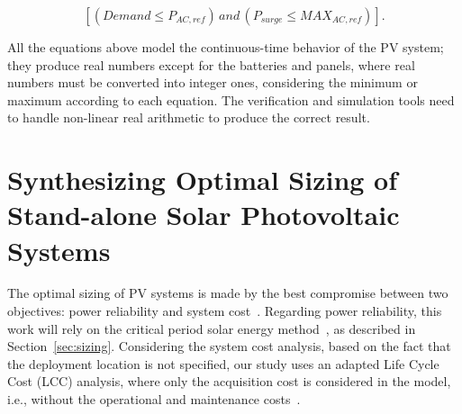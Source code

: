 \documentclass[runningheads]{llncs}
\begin{document}
\begin{equation}
\label{eq:invcheck} 
\left[ (Demand \leq P_{AC,ref}) \, and \, (P_{surge} \leq MAX_{AC,ref}) \right].
\end{equation}

All the equations above model the continuous-time behavior of the PV system; they produce real numbers except for the batteries and panels, where real numbers must be converted into integer ones, considering the minimum or maximum according to each equation. The verification and simulation tools need to handle non-linear real arithmetic to produce the correct result.

\section{Synthesizing Optimal Sizing of Stand-alone Solar Photovoltaic Systems}

The optimal sizing of PV systems is made by the best compromise between two objectives: power reliability and system cost~\cite{Alsadi2018}. 
Regarding power reliability, this work will rely on the critical period solar energy method~\cite{Pinho}, as described in Section~\ref{sec:sizing}. 
Considering the system cost analysis, based on the fact that the deployment location is not specified, our study uses an adapted Life Cycle Cost (LCC) analysis, where only the acquisition cost is considered in the model, i.e., without the operational and maintenance costs~\cite{Alsadi2018}.
\end{document}

